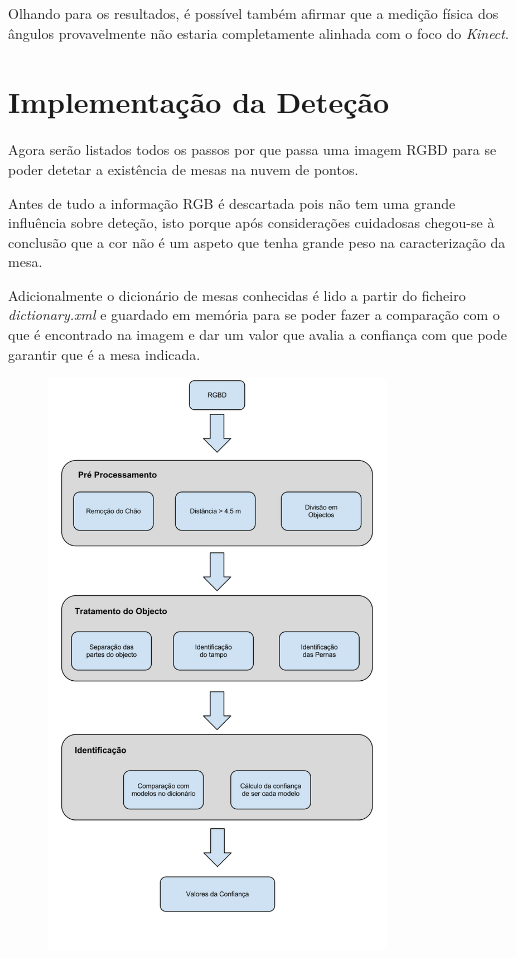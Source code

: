 Olhando para os resultados, é possível também afirmar que a medição física dos ângulos provavelmente não estaria completamente alinhada com o foco do \emph{Kinect}.

\vspace*{12mm}


\section {Implementação da Deteção}

Agora serão listados todos os passos por que passa uma imagem RGBD para se poder detetar a existência de mesas na nuvem de pontos.

Antes de tudo a informação RGB é descartada pois não tem uma grande influência sobre deteção, isto porque após considerações cuidadosas chegou-se à conclusão que a cor não é um aspeto que tenha grande peso na caracterização da mesa.

Adicionalmente o dicionário de mesas conhecidas é lido a partir do ficheiro \emph{dictionary.xml} e guardado em memória para se poder fazer a comparação com o que é encontrado na imagem e dar um valor que avalia a confiança com que pode garantir que é a mesa indicada.


\begin{figure}[h!]
	\begin{center}
	\includegraphics[width=0.80\textwidth]{figures/processo_identificacao.png}
		\label{fig:processamento}
	\end{center}
\end{figure}


